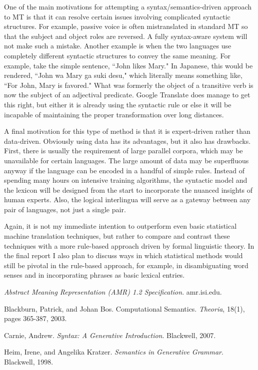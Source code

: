 \documentclass[11pt, oneside]{article}      %
\begin{document}
One of the main motivations for attempting a syntax/semantics-driven approach to MT is that it can resolve certain issues involving complicated syntactic structures. For example, passive voice is often mistranslated in standard MT so that the subject and object roles are reversed.  A fully syntax-aware system will not make such a mistake.  Another example is when the two languages use completely different syntactic structures to convey the same meaning.  For example, take the simple sentence, ``John likes Mary."  In Japanese, this would be rendered, ``John wa Mary ga suki desu," which literally means something like, ``For John, Mary is favored."  What was formerly the object of a transitive verb is now the subject of an adjectival predicate.  Google Translate does manage to get this right, but either it is already using the syntactic rule or else it will be incapable of maintaining the proper transformation over long distances.

A final motivation for this type of method is that it is expert-driven rather than data-driven.  Obviously using data has its advantages, but it also has drawbacks.  First, there is usually the requirement of large parallel corpora, which may be unavailable for certain languages.  The large amount of data may be superfluous anyway if the language can be encoded in a handful of simple rules.  Instead of spending many hours on intensive training algorithms, the syntactic model and the lexicon will be designed from the start to incorporate the nuanced insights of human experts.  Also, the logical interlingua will serve as a gateway between any pair of languages, not just a single pair.

Again, it is not my immediate intention to outperform even basic statistical machine translation techniques, but rather to compare and contrast these techniques with a more rule-based approach driven by formal linguistic theory.  In the final report I also plan to discuss ways in which statistical methods would still be pivotal in the rule-based approach, for example, in disambiguating word senses and in incorporating phrases as basic lexical entries.

\begin{thebibliography}{1}

 {\em Abstract Meaning Representation (AMR) 1.2 Specification}. amr.isi.edu.

 Blackburn, Patrick, and Johan Bos.  Computational Semantics.  {\em Theoria}, 18(1), pages 365-387, 2003.

 Carnie, Andrew. {\em Syntax: A Generative Introduction}. Blackwell, 2007.

 Heim, Irene, and Angelika Kratzer.  {\em Semantics in Generative Grammar}.  Blackwell, 1998.

\end{thebibliography}
\end{document}
